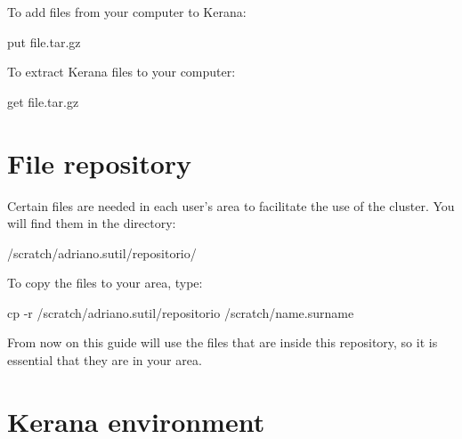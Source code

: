 \noindent To add files from your computer to Kerana:
\bigskip

\begin{bashcode}
put file.tar.gz
\end{bashcode}
\bigskip

\noindent To extract Kerana files to your computer:
\bigskip

\begin{bashcode}
get file.tar.gz
\end{bashcode}
\bigskip

\section{File repository}\label{reposit}
\bigskip

\noindent Certain files are needed in each user's area to facilitate the use of the cluster. You will find them in the directory:
\bigskip

\begin{bashcode}
/scratch/adriano.sutil/repositorio/
\end{bashcode}
\bigskip

\noindent To copy the files to your area, type:
\bigskip

\begin{bashcode}
cp -r /scratch/adriano.sutil/repositorio /scratch/name.surname
\end{bashcode}
\bigskip

\begin{tcolorbox}[enhanced,
  grow to left by   = 0cm,
  grow to right by  = 0cm,
  enlarge top by    = 0cm,
  enlarge bottom by = 0cm,
  tcbox raise base,
  boxrule           = 1.0pt,
  left              = 18mm,
  colframe          = red!50!black,coltext=red!25!black,colback=red!10!white,
  overlay           = {\begin{tcbclipinterior}\fill[red!75!blue!50!white] (frame.south west)
    rectangle node[text=white,font=\sffamily\bfseries\footnotesize,rotate=0] {WARNING} ([xshift=18mm]frame.north west);\end{tcbclipinterior}}]
    From now on this guide will use the files that are inside this repository, so it is essential that they are in your area.
\end{tcolorbox}
\bigskip

\section{Kerana environment}
\bigskip

